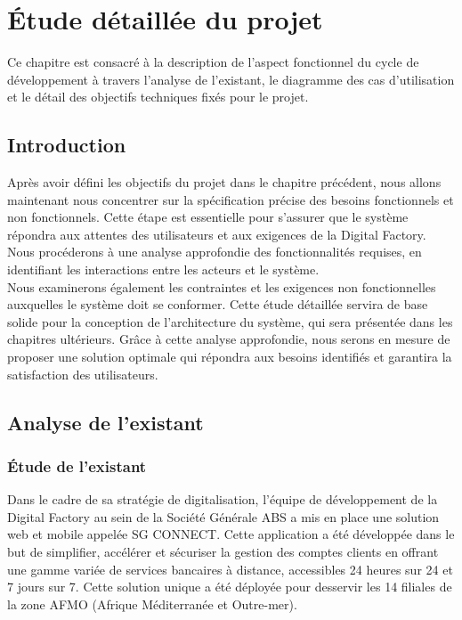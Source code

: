 \chapter{Étude détaillée du projet}
\par Ce chapitre est consacré à la description de l'aspect fonctionnel du cycle de développement à travers l'analyse de l'existant, le diagramme des cas d'utilisation et le détail des objectifs techniques fixés pour le projet.


\clearpage
\section{Introduction}
Après avoir défini les objectifs du projet dans le chapitre précédent, nous allons maintenant nous concentrer sur la spécification précise des besoins fonctionnels et non fonctionnels. Cette étape est essentielle pour s'assurer que le système répondra aux attentes des utilisateurs et aux exigences de la Digital Factory. Nous procéderons à une analyse approfondie des fonctionnalités requises, en identifiant les interactions entre les acteurs et le système. \\
Nous examinerons également les contraintes et les exigences non fonctionnelles auxquelles le système doit se conformer. Cette étude détaillée servira de base solide pour la conception de l'architecture du système, qui sera présentée dans les chapitres ultérieurs. Grâce à cette analyse approfondie, nous serons en mesure de proposer une solution optimale qui répondra aux besoins identifiés et garantira la satisfaction des utilisateurs.

\section{Analyse de l'existant}
\subsection{Étude de l'existant}
Dans le cadre de sa stratégie de digitalisation, l'équipe de développement de la Digital Factory au sein de la Société Générale ABS a mis en place une solution web et mobile appelée SG CONNECT. Cette application a été développée dans le but de simplifier, accélérer et sécuriser la gestion des comptes clients en offrant une gamme variée de services bancaires à distance, accessibles 24 heures sur 24 et 7 jours sur 7. Cette solution unique a été déployée pour desservir les 14 filiales de la zone AFMO (Afrique Méditerranée et Outre-mer).\\

